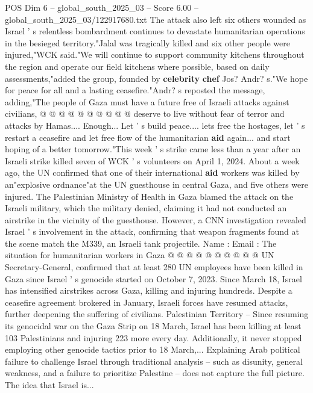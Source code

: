 \begin{textsample}{POS Dim 6 – global\_south\_2025\_03 – Score 6.00 – global\_south\_2025\_03/122917680.txt}
The attack also left six others wounded as Israel ' s relentless bombardment continues to devastate humanitarian operations in the besieged territory."Jalal was tragically killed and six other people were injured,"WCK said."We will continue to support community kitchens throughout the region and operate our field kitchens where possible, based on daily assessments,"added the group, founded by \textbf{celebrity} \textbf{chef} Jos?
Andr? s."We hope for peace for all and a lasting ceasefire."Andr? s reposted the message, adding,"The people of Gaza must have a future free of Israeli attacks against civilians, @ @ @ @ @ @ @ @ @ @ deserve to live without fear of terror and attacks by Hamas....
Enough...
Let ' s build peace.... lets free the hostages, let ' s restart a ceasefire and let free flow of the humanitarian \textbf{aid} again... and start hoping of a better tomorrow."This week ' s strike came less than a year after an Israeli strike killed seven of WCK ' s volunteers on April 1, 2024.
About a week ago, the UN confirmed that one of their international \textbf{aid} workers was killed by an"explosive ordnance"at the UN guesthouse in central Gaza, and five others were injured.
The Palestinian Ministry of Health in Gaza blamed the attack on the Israeli military, which the military denied, claiming it had not conducted an airstrike in the vicinity of the guesthouse.
However, a CNN investigation revealed Israel ' s involvement in the attack, confirming that weapon fragments found at the scene match the M339, an Israeli tank projectile.
Name : Email : The situation for humanitarian workers in Gaza @ @ @ @ @ @ @ @ @ @ UN Secretary-General, confirmed that at least 280 UN employees have been killed in Gaza since Israel ' s genocide started on October 7, 2023.
Since March 18, Israel has intensified airstrikes across Gaza, killing and injuring hundreds.
Despite a ceasefire agreement brokered in January, Israeli forces have resumed attacks, further deepening the suffering of civilians.
Palestinian Territory -- Since resuming its genocidal war on the Gaza Strip on 18 March, Israel has been killing at least 103 Palestinians and injuring 223 more every day.
Additionally, it never stopped employing other genocide tactics prior to 18 March,...
Explaining Arab political failure to challenge Israel through traditional analysis -- such as disunity, general weakness, and a failure to prioritize Palestine -- does not capture the full picture.
The idea that Israel is...

\end{textsample}
